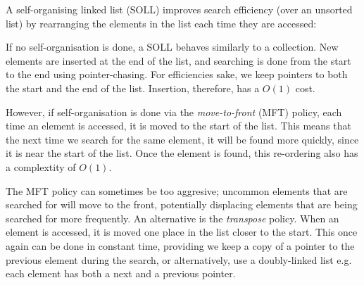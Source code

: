 
A self-organising linked list (SOLL) improves search efficiency (over
an unsorted list) by rearranging the elements in the list each time they
are accessed: 


If no self-organisation is done, a SOLL behaves similarly to a collection.
New elements are inserted at the end of the list, and searching is done
from the start to the end using pointer-chasing.  For efficiencies sake,
we keep pointers to both the start and the end of the list. Insertion,
therefore, has a $O(1)$ cost.

However, if self-organisation is done via the {\it move-to-front} (MFT)
policy, each time an element is accessed, it is moved to the start of the
list. This means that the next time we search for the same element, it
will be found more quickly, since it is near the start of the list. Once
the element is found, this re-ordering also has a complextity of $O(1)$.

The MFT policy can sometimes be too aggresive; uncommon elements that
are searched for will move to the front, potentially displacing elements that
are being searched for more frequently. An alternative is the
{\it transpose} policy. When an element is accessed, it is moved one
place in the list closer to the start. This once again can be done in
constant time, providing we keep a copy of a pointer to the previous
element during the search, or alternatively, use a doubly-linked list
e.g. each element has both a next and a previous pointer.


